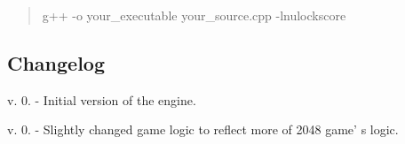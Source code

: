 \begin{quotation}
g++ -\/o your\-\_\-executable your\-\_\-source.\-cpp -\/lnulockscore

\end{quotation}


\subsection*{Changelog }


\begin{DoxyItemize}
\item v. 0. -\/ Initial version of the engine.
\item v. 0. -\/ Slightly changed game logic to reflect more of 2048 game' s logic. 
\end{DoxyItemize}